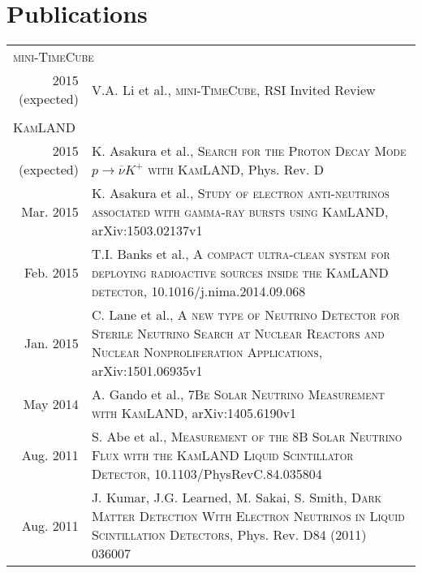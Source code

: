 \documentclass[a4paper,10pt]{article} %
\begin{document}
\section{Publications}

\begin{tabular}{rp{11cm}}
	\multicolumn{2}{l}{\textsc{mini-TimeCube}} \\
	2015 (expected) & V.A. Li et al., \textsc{mini-TimeCube}, RSI Invited Review\\
	\multicolumn{2}{c}{} \\
	\multicolumn{2}{l}{\textsc{KamLAND}} \\
	2015 (expected) & K. Asakura et al., \textsc{Search for the Proton Decay
Mode $p \rightarrow \overline{\nu} K^{+}$ with KamLAND}, Phys. Rev. D\\
	Mar. 2015 & K. Asakura et al., \textsc{Study of electron anti-neutrinos
	associated with gamma-ray bursts using KamLAND}, arXiv:1503.02137v1\\
	Feb. 2015 & T.I. Banks et al., \textsc{A compact ultra-clean system for
	deploying radioactive sources inside the KamLAND detector},
	10.1016/j.nima.2014.09.068\\
	Jan. 2015 & C. Lane et al., \textsc{A new type of Neutrino Detector for
	Sterile Neutrino Search at Nuclear Reactors and Nuclear Nonproliferation
	Applications}, arXiv:1501.06935v1\\
	May 2014 & A. Gando et al., \textsc{7Be Solar Neutrino Measurement with
	KamLAND}, arXiv:1405.6190v1\\
	Aug. 2011 & S. Abe et al., \textsc{Measurement of the 8B Solar Neutrino
	Flux with the KamLAND Liquid Scintillator Detector},
	10.1103/PhysRevC.84.035804\\
	Aug. 2011 & J. Kumar, J.G. Learned, M. Sakai, S. Smith,
	\textsc{Dark Matter Detection With Electron Neutrinos in Liquid
	Scintillation Detectors}, Phys. Rev. D84 (2011) 036007\\
\end{tabular}

\end{document}
